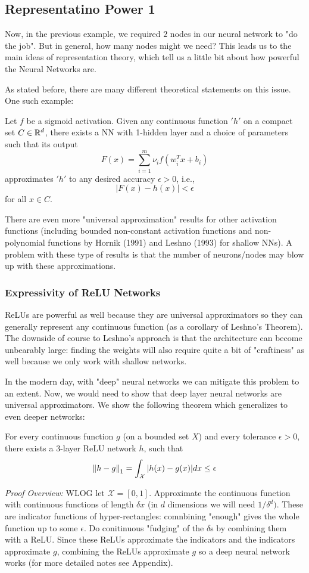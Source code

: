 \documentclass[11pt]{scrartcl}
\begin{document}
\subsection{Representatino Power 1}
Now, in the previous example, we required $2$ nodes in our neural network to "do the job". But in general, how many nodes might we need? This leads us to the main ideas of representation theory, which tell us a little bit about how powerful the Neural Networks are. 

As stated before, there are many different theoretical statements on this issue. One such example:
\begin{thm}[Cybenko, 1989]
Let $f$ be a sigmoid activation. Given any continuous function $'h'$ on a compact set $C \in \mathbb{R}^{d}$, there exists a NN with 1-hidden layer and a choice of parameters such that its output $$F(x)=\sum_{i=1}^{m}\nu_if(w_i^{T}x+b_i)$$
approximates $'h'$ to any desired accuracy $\epsilon>0$, i.e., $$|F(x)- h(x)| < \epsilon$$ for all $x \in C$.
\end{thm}
There are even more "universal approximation" results for other activation functions (including bounded non-constant activation functions and non-polynomial functions by Hornik (1991) and Leshno (1993) for shallow NNs). A problem with these type of results is that the number of neurons/nodes may blow up with these approximations. 

\subsubsection{Expressivity of ReLU Networks}
ReLUs are powerful as well because they are universal approximators so they can generally represent any continuous function (as a corollary of Leshno's Theorem). The downside of course to Leshno's approach is that the architecture can become unbearably large: finding the weights will also require quite a bit of "craftiness" as well because we only work with shallow networks. 

In the modern day, with "deep" neural networks we can mitigate this problem to an extent. Now, we would need to show that deep layer neural networks are universal approximators. We show the following theorem which generalizes to even deeper networks:

\begin{thm}
For every continuous function $g$ (on a bounded set $X$) and every tolerance $\epsilon >0$, there exists a $3$-layer ReLU network $h$, such that $$\left\lVert h-g\right\rVert_1 = \int_{\mathcal{X}}|h(x)-g(x)|dx \le \epsilon$$
\end{thm}
\textit{Proof Overview:} WLOG let $\mathcal{X} = [0,1]$. Approximate the continuous function with continuous functions of length $\delta{x}$ (in $d$ dimensions we will need $1/\delta^d)$. These are indicator functions of hyper-rectangles: comnbining "enough" gives the whole function up to some $\epsilon$. Do conitinuous "fudging" of the $\delta$s by combining them with a ReLU. Since these ReLUs approximate the indicators and the indicators approximate $g$, combining the ReLUs approximate $g$ so a deep neural network works (for more detailed notes see Appendix). 
\end{document}
